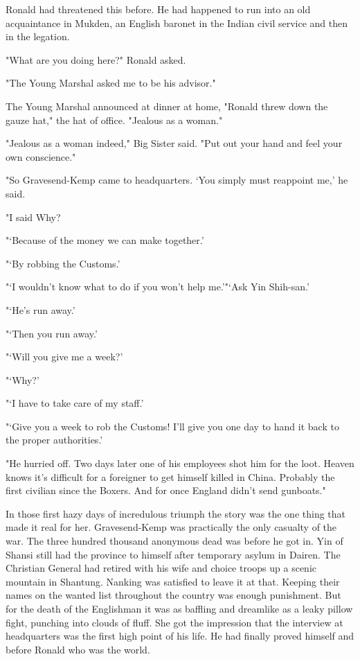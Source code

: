 \par Ronald had threatened this before. He had happened to run into an old acquaintance in Mukden, an English baronet in the Indian civil service and then in the legation.
\par "What are you doing here?" Ronald asked.
\par "The Young Marshal asked me to be his advisor."
\par The Young Marshal announced at dinner at home, "Ronald threw down the gauze hat," the hat of office. "Jealous as a woman."
\par "Jealous as a woman indeed," Big Sister said. "Put out your hand and feel your own conscience."
\par "So Gravesend-Kemp came to headquarters. ‘You simply must reappoint me,' he said.
\par "I said Why?
\par "‘Because of the money we can make together.'
\par "‘By robbing the Customs.'
\par "‘I wouldn't know what to do if you won't help me.'"‘Ask Yin Shih-san.'
\par "‘He's run away.'
\par "‘Then you run away.'
\par "‘Will you give me a week?'
\par "‘Why?'
\par "‘I have to take care of my staff.'
\par "‘Give you a week to rob the Customs! I'll give you one day to hand it back to the proper authorities.'
\par "He hurried off. Two days later one of his employees shot him for the loot. Heaven knows it's difficult for a foreigner to get himself killed in China. Probably the first civilian since the Boxers. And for once England didn't send gunboats."
\par In those first hazy days of incredulous triumph the story was the one thing that made it real for her. Gravesend-Kemp was practically the only casualty of the war. The three hundred thousand anonymous dead was before he got in. Yin of Shansi still had the province to himself after temporary asylum in Dairen. The Christian General had retired with his wife and choice troops up a scenic mountain in Shantung. Nanking was satisfied to leave it at that. Keeping their names on the wanted list throughout the country was enough punishment. But for the death of the Englishman it was as baffling and dreamlike as a leaky pillow fight, punching into clouds of fluff. She got the impression that the interview at headquarters was the first high point of his life. He had finally proved himself and before Ronald who was the world.
